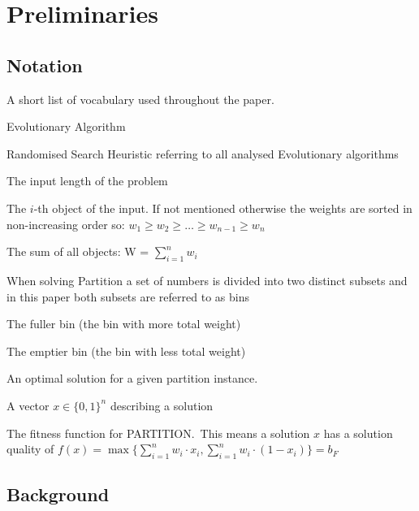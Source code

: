 
\chapter{Preliminaries}\label{ch:preliminaries}

\section{Notation}
A short list of vocabulary used throughout the paper.
\begin{description}[leftmargin=!,labelwidth=\widthof{\bfseries RSH}]
    \item[EA] Evolutionary Algorithm
    \item[RSH] Randomised Search Heuristic referring to all analysed Evolutionary algorithms
    \item[$n$] The input length of the problem
    \item[$w_i$] The $i$-th object of the input. If not mentioned otherwise the weights are sorted in non-increasing order so: \(w_1 \ge w_2 \ge \ldots \ge w_{n-1} \ge w_{n}\)
    \item[$W$] The sum of all objects: W = $\sum_{i=1}^{n}w_i$
    \item[bin] When solving Partition a set of numbers is divided into two distinct subsets and in this paper both subsets are referred to as bins
    \item[$b_F$] The fuller bin (the bin with more total weight)
    \item[$b_E$] The emptier bin (the bin with less total weight)
    \item[$opt$] An optimal solution for a given partition instance.
    \item[$x$] A vector $x \in {\{0, 1\}}^n$ describing a solution
    \item[$f(x)$] The fitness function for PARTITION.\ This means a solution $x$ has a solution quality of \(f(x)=\max\{\sum_{i=1}^{n}w_i\cdot x_i, \sum_{i=1}^{n}w_i\cdot(1-x_i)\}=b_F\)
\end{description}

\section{Background}
